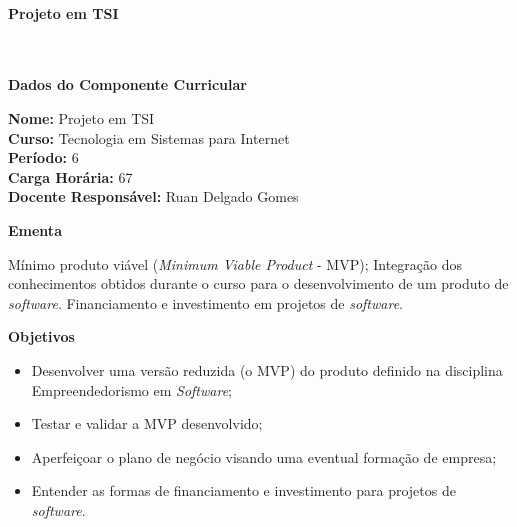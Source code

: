 \paragraph{Projeto em TSI} \


\begin{snugshade}\begin{center}\textbf{
    Dados do Componente Curricular
}\end{center}\end{snugshade}

\noindent \textbf{Nome:}                Projeto em TSI
\\        \textbf{Curso:}               Tecnologia em Sistemas para Internet
\\        \textbf{Período:}             \unit{6}{\degree}
\\        \textbf{Carga Horária:}       \unit{67}{\hour}
\\        \textbf{Docente Responsável:} Ruan Delgado Gomes


\begin{snugshade}\begin{center}\textbf{
    Ementa
\vphantom{q}}\end{center}\end{snugshade}

\noindent
M\'inimo produto vi\'avel (\textit{Minimum Viable Product} - MVP); Integra\c{c}\~ao dos conhecimentos obtidos durante o curso para o desenvolvimento de um produto de \textit{software}. Financiamento e investimento em projetos de \textit{software}.


\begin{snugshade}\begin{center}\textbf{
    Objetivos
}\end{center}\end{snugshade}

\begin{itemize}

\item Desenvolver uma vers\~ao reduzida (o MVP) do produto definido na disciplina Empreendedorismo em \textit{Software};

\item Testar e validar a MVP desenvolvido;

\item Aperfei\c{c}oar o plano de neg\'ocio visando uma eventual forma\c{c}\~ao de empresa;

\item Entender as formas de financiamento e investimento para projetos de \textit{software}.

\end{itemize} 

